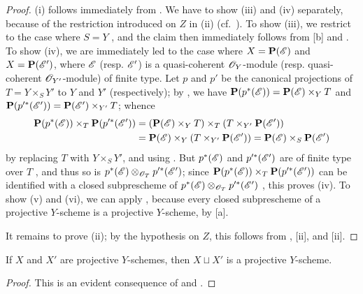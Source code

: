\begin{proof}
\label{proof-II.5.5.5}
(i) follows immediately from .
We have to show (iii) and (iv) separately, because of the restriction introduced on $Z$ in (ii) (cf.~).
To show (iii), we restrict to the case where $S=Y$ , and the claim then immediately follows from [b] and .
To show (iv), we are immediately led to the case where $X=\mathbf{P}(\mathscr{E})$ and $X=\mathbf{P}(\mathscr{E}')$, where $\mathscr{E}$ (resp. $\mathscr{E}'$) is a quasi-coherent $\mathscr{O}_Y$-module (resp. quasi-coherent $\mathscr{O}_{Y'}$-module) of finite type.
Let $p$ and $p'$ be the canonical projections of $T=Y\times_S Y'$ to $Y$ and $Y'$ (respectively); by , we have $\mathbf{P}(p^*(\mathscr{E})) = \mathbf{P}(\mathscr{E})\times_Y T$ and $\mathbf{P}(p^{\prime *}(\mathscr{E}'))=\mathbf{P}(\mathscr{E}')\times_{Y'}T$; whence
\begin{align*}
  \mathbf{P}(p^*(\mathscr{E}))\times_T\mathbf{P}(p^{\prime *}(\mathscr{E}'))&=(\mathbf{P}(\mathscr{E})\times_Y T)\times_T(T\times_{Y'}\mathbf{P}(\mathscr{E}'))\\
                                              &=\mathbf{P}(\mathscr{E})\times_Y(T\times_{Y'}\mathbf{P}(\mathscr{E}'))=\mathbf{P}(\mathscr{E})\times_S\mathbf{P}(\mathscr{E}')
\end{align*}
by replacing $T$ with $Y\times_S Y'$, and using .
But $p^*(\mathscr{E})$ and $p^{\prime *}(\mathscr{E}')$ are of finite type over $T$ , and thus so is $p^*(\mathscr{E})\otimes_{\mathscr{O}_T}p^{\prime *}(\mathscr{E}')$;
since $\mathbf{P}(p^*(\mathscr{E}))\times_T\mathbf{P}(p^{\prime *}(\mathscr{E}'))$ can be identified with a closed subprescheme of $p^*(\mathscr{E})\otimes_{\mathscr{O}_T}p^{\prime *}(\mathscr{E}')$ , this proves (iv).
To show (v) and (vi), we can apply , because every closed subprescheme of a projective $Y$-scheme is a projective $Y$-scheme, by [a].

It remains to prove (ii); by the hypothesis on $Z$, this follows from , [ii], and [ii].
\end{proof}

\begin{proposition}[5.5.6]
\label{II.5.5.6}
If $X$ and $X'$ are projective $Y$-schemes, then $X\sqcup X'$ is a projective $Y$-scheme.
\end{proposition}

\begin{proof}
\label{proof-II.5.5.6}
This is an evident consequence of  and .
\end{proof}

